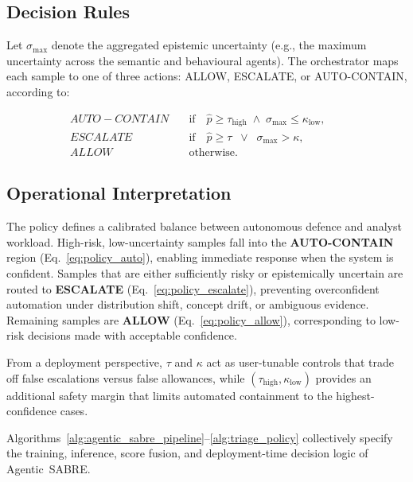 \documentclass[3p]{elsarticle}
\begin{document}
\subsection{Decision Rules}
\label{subsec:policy_rules}

Let $\sigma_{\max}$ denote the aggregated epistemic uncertainty (e.g., the maximum
uncertainty across the semantic and behavioural agents). The orchestrator maps each
sample to one of three actions: \textsc{ALLOW}, \textsc{ESCALATE}, or
\textsc{AUTO-CONTAIN}, according to:

\begin{align}
AUTO-CONTAIN \quad &\text{if} \quad   \hat{p}\ge \tau_{\text{high}}\;\wedge\;\sigma_{\max}\le \kappa_{\text{low}}, \label{eq:policy_auto} \\
ESCALATE \quad &\text{if} \quad  \hat{p}\ge \tau \;\;\vee\;\; \sigma_{\max} > \kappa, 
\label{eq:policy_escalate}  \\
ALLOW \quad &\text{otherwise}. && \label{eq:policy_allow}
\end{align}


\subsection{Operational Interpretation}
\label{subsec:policy_interpretation}

The policy defines a calibrated balance between autonomous defence and analyst workload.
High-risk, low-uncertainty samples fall into the \textbf{AUTO-CONTAIN} region
(Eq.~\ref{eq:policy_auto}), enabling immediate response when the system is confident.
Samples that are either sufficiently risky or epistemically uncertain are routed to
\textbf{ESCALATE} (Eq.~\ref{eq:policy_escalate}), preventing overconfident automation
under distribution shift, concept drift, or ambiguous evidence.
Remaining samples are \textbf{ALLOW} (Eq.~\ref{eq:policy_allow}), corresponding to
low-risk decisions made with acceptable confidence.

From a deployment perspective, $\tau$ and $\kappa$ act as user-tunable controls that
trade off false escalations versus false allowances, while
$(\tau_{\text{high}},\kappa_{\text{low}})$ provides an additional safety margin that
limits automated containment to the highest-confidence cases.


Algorithms~\ref{alg:agentic_sabre_pipeline}--\ref{alg:triage_policy}
collectively specify the training, inference, score fusion, and deployment-time
decision logic of Agentic~SABRE.
\end{document}
